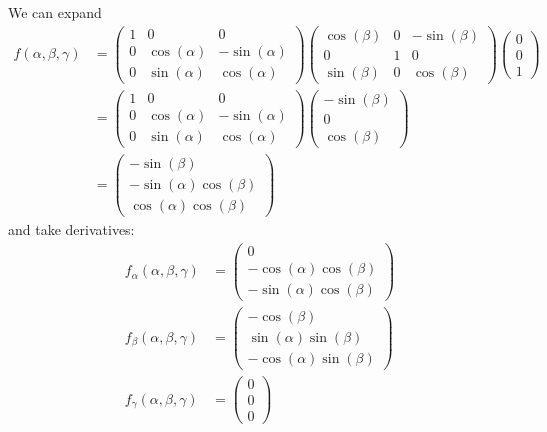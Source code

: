 \documentclass[12pt]{article}
\begin{document}
        We can expand 
        \begin{align*}
            f(\alpha, \beta, \gamma) &= \begin{pmatrix}
                1 & 0 & 0 \\
                0 & \cos(\alpha) &-\sin(\alpha) \\
                0 & \sin(\alpha) & \cos(\alpha)
            \end{pmatrix} \begin{pmatrix} 
                \cos(\beta) & 0 & -\sin(\beta) \\
                0 & 1 & 0 \\
                \sin(\beta) & 0 & \cos(\beta)
            \end{pmatrix} \begin{pmatrix}
                0\\0\\1
            \end{pmatrix}\\
            &= \begin{pmatrix}
                1 & 0 & 0 \\
                0 & \cos(\alpha) &-\sin(\alpha) \\
                0 & \sin(\alpha) & \cos(\alpha)
            \end{pmatrix} \begin{pmatrix}
                -\sin(\beta)\\0\\ \cos(\beta)
            \end{pmatrix}\\
            &= \begin{pmatrix}
                -\sin(\beta)\\
                -\sin(\alpha) \cos(\beta)\\
                \cos(\alpha) \cos(\beta)
            \end{pmatrix}
        \end{align*}
        and take derivatives:
        \begin{align*}
            f_{\alpha}(\alpha, \beta, \gamma) &= \begin{pmatrix}
                0\\ 
                -\cos(\alpha)\cos(\beta)\\ 
                -\sin(\alpha)\cos(\beta)
            \end{pmatrix}\\ 
            f_{\beta}(\alpha, \beta, \gamma) &= \begin{pmatrix}
                -\cos(\beta)\\
                \sin(\alpha)\sin(\beta)\\
                -\cos(\alpha)\sin(\beta)
            \end{pmatrix}\\
            f_{\gamma}(\alpha, \beta, \gamma) &= \begin{pmatrix}
                0\\
                0\\
                0
            \end{pmatrix}
        \end{align*}
\end{document}
